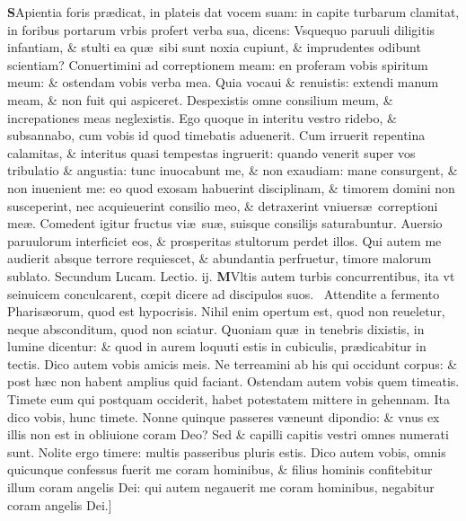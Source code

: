 \documentclass[a5paper,10pt]{book}
\def\leftmarginnote{%
	\lrmarginnote{\hskip -\marginparsep \hskip -6.5em}}
\def\rightmarginnote{%
	\lrmarginnote{\hskip\columnwidth \hskip -1em}}
\def\ae{æ}
\def\oe{œ}
\begin{document}
\begin{multicols*}{2}
\vspace{-1.25em}
\lettrine[lines=2]{\bfseries S}{}Apientia\rightmarginnote{ca. 1.} foris pr\ae dicat, in plateis dat vocem suam: in capite turbarum clamitat, in foribus portarum vrbis profert verba sua, dicens: Vsquequo paruuli diligitis infantiam, \& stulti ea qu\ae \ sibi sunt noxia cupiunt, \& imprudentes odibunt scientiam?
Conuertimini ad correptionem meam: en proferam vobis spiritum meum: \& ostendam vobis verba mea.
Quia vocaui \& renuistis: extendi manum meam, \& non fuit qui aspiceret.
Despexistis omne consilium meum, \& increpationes meas neglexistis.
Ego quoque in interitu vestro ridebo, \& subsannabo, cum vobis id quod timebatis aduenerit.
Cum irruerit repentina calamitas, \& interitus quasi tempestas ingruerit: quando venerit super vos tribulatio \& angustia: tunc inuocabunt me, \& non exaudiam: mane consurgent, \& non inuenient me: eo quod exosam habuerint disciplinam, \& timorem domini non susceperint, nec acquieuerint consilio meo, \& detraxerint vniuers\ae \ correptioni me\ae .
Comedent igitur fructus vi\ae \ su\ae , suisque consilijs saturabuntur.
Auersio paruulorum interficiet eos, \& prosperitas stultorum perdet illos.
Qui autem me audierit absque terrore requiescet, \& abundantia perfruetur, timore malorum sublato.
\newline \color{red} Secundum Lucam. \hfill Lectio. ij. \color{black}
\vspace{-.25em}
\lettrine[lines=2]{\bfseries \color{red} M}{}Vltis\rightmarginnote{c. 12.} autem turbis concurrentibus, ita vt seinuicem conculcarent, c\oe pit dicere ad discipulos suos. \textdagger \ Attendite\rightmarginnote{A} a fermento Pharis\ae orum, quod est hypocrisis.
Nihil enim opertum est, quod non reueletur, neque absconditum, quod non sciatur.
Quoniam qu\ae \ in tenebris dixistis, in lumine dicentur: \& quod in aurem loquuti estis in cubiculis, pr\ae dicabitur in tectis.
Dico autem vobis amicis meis. Ne terreamini ab his qui occidunt corpus: \& post h\ae c non habent amplius quid faciant.
Ostendam autem vobis quem timeatis. Timete eum qui postquam occiderit, habet potestatem mittere in gehennam. Ita dico vobis, hunc timete.
Nonne quinque passeres v\ae neunt dipondio: \& vnus ex illis non est in obliuione coram Deo?
Sed \& capilli capitis vestri omnes numerati sunt. Nolite ergo timere: multis passeribus pluris estis.
Dico autem vobis, omnis quicunque confessus fuerit me coram hominibus, \& filius hominis confitebitur illum coram angelis Dei: qui autem negauerit me coram hominibus, negabitur coram angelis\leftmarginnote{\begin{flushright}B\end{flushright}} Dei.]

\end{multicols*}
\end{document}
